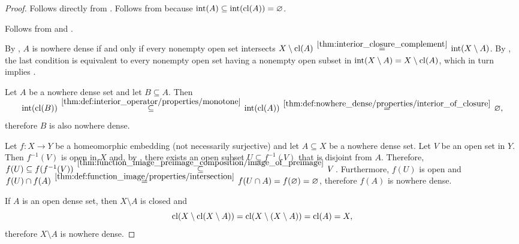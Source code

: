 \begin{proof}
   Follows directly from .
   Follows from  because \( \operatorname{int}(A) \subseteq \operatorname{int}(\operatorname{cl}(A)) = \varnothing \).

   Follows from  and .

   By , \( A \) is nowhere dense if and only if every nonempty open set intersects \( X \setminus \cl(A) \reloset {\ref{thm:interior_closure_complement}} = \Int(X \setminus A) \). By , the last condition is equivalent to every nonempty open set having a nonempty open subset in \( \operatorname{int}(X \setminus A) = X \setminus \operatorname{cl}(A) \), which in turn implies .

   Let \( A \) be a nowhere dense set and let \( B \subseteq A \). Then
  \begin{equation*}
    \Int(\cl(B))
    \reloset {\ref{thm:def:interior_operator/properties/monotone}} \subseteq
    \Int(\cl(A))
    \reloset {\ref{thm:def:nowhere_dense/properties/interior_of_closure}} =
    \varnothing,
  \end{equation*}
  therefore \( B \) is also nowhere dense.

   Let \( f: X \to Y \) be a homeomorphic embedding (not necessarily surjective) and let \( A \subseteq X \) be a nowhere dense set. Let \( V \) be an open set in \( Y \). Then \( f^{-1}(V) \) is open in \( X \) and, by , there exists an open subset \( U \subseteq f^{-1}(V) \) that is disjoint from \( A \). Therefore, \( f(U) \subseteq f(f^{-1}(V)) \reloset {\ref{thm:function_image_preimage_composition/image_of_preimage}} \subseteq V \). Furthermore, \( f(U) \) is open and \( f(U) \cap f(A) \reloset {\ref{thm:def:function_image/properties/intersection}} = f(U \cap A) = f(\varnothing) = \varnothing \), therefore \( f(A) \) is nowhere dense.

   If \( A \) is an open dense set, then \( X \setminus A \) is closed and
  \begin{equation*}
    \operatorname{cl}(X \setminus \operatorname{cl}(X \setminus A))
    =
    \operatorname{cl}(X \setminus (X \setminus A))
    =
    \operatorname{cl}(A)
    =
    X,
  \end{equation*}
  therefore \( X \setminus A \) is nowhere dense.
\end{proof}

